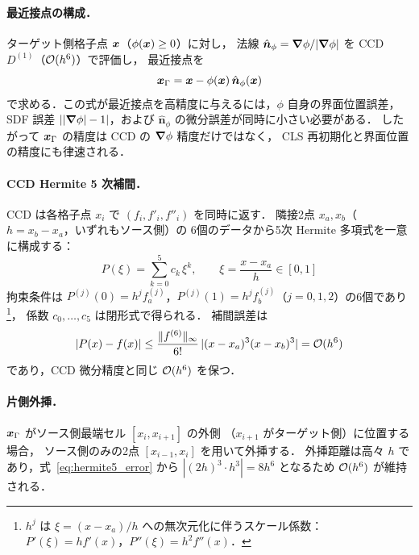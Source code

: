 \paragraph{最近接点の構成．}
ターゲット側格子点 $\bm{x}$（$\phi(\bm{x}) \geq 0$）に対し，
法線 $\hat{\bm n}_{\phi} = \bm{\nabla}\phi/|\bm{\nabla}\phi|$ を CCD $D^{(1)}$（$\mathcal{O}(h^6)$）で評価し，
最近接点を
\begin{equation}
  \bm{x}_\Gamma = \bm{x} - \phi(\bm{x})\,\hat{\bm n}_{\phi}(\bm{x})
  \label{eq:closest_point}
\end{equation}
で求める．この式が最近接点を高精度に与えるには，$\phi$ 自身の界面位置誤差，
SDF 誤差 $||\bm{\nabla}\phi|-1|$，および $\hat{\bm n}_{\phi}$ の微分誤差が同時に小さい必要がある．
したがって $\bm{x}_\Gamma$ の精度は CCD の $\bm{\nabla}\phi$ 精度だけではなく，
CLS 再初期化と界面位置の精度にも律速される．

\paragraph{CCD Hermite 5 次補間．}
CCD は各格子点 $x_i$ で $(f_i, f'_i, f''_i)$ を同時に返す．
隣接2点 $x_a, x_b$（$h = x_b - x_a$，いずれもソース側）の
6個のデータから5次 Hermite 多項式を一意に構成する：
\begin{equation}
  P(\xi) = \sum_{k=0}^{5} c_k \,\xi^k, \qquad \xi = \frac{x - x_a}{h} \in [0,1]
  \label{eq:hermite5}
\end{equation}
拘束条件は $P^{(j)}(0) = h^j f_a^{(j)}$，$P^{(j)}(1) = h^j f_b^{(j)}$（$j = 0,1,2$）の6個であり%
\footnote{$h^j$ は $\xi = (x-x_a)/h$ への無次元化に伴うスケール係数：
$P'(\xi) = h f'(x)$，$P''(\xi) = h^2 f''(x)$．}，
係数 $c_0,\ldots,c_5$ は閉形式で得られる．
補間誤差は
\begin{equation}
  |P(x) - f(x)| \leq \frac{\|f^{(6)}\|_\infty}{6!}\,|(x-x_a)^3(x-x_b)^3| = \mathcal{O}(h^6)
  \label{eq:hermite5_error}
\end{equation}
であり，CCD 微分精度と同じ $\mathcal{O}(h^6)$ を保つ．

\paragraph{片側外挿．}
$\bm{x}_\Gamma$ がソース側最端セル $[x_i, x_{i+1}]$ の外側
（$x_{i+1}$ がターゲット側）に位置する場合，
ソース側のみの2点 $[x_{i-1}, x_i]$ を用いて外挿する．
外挿距離は高々 $h$ であり，式~\eqref{eq:hermite5_error} から
$|(2h)^3 \cdot h^3| = 8h^6$ となるため $\mathcal{O}(h^6)$ が維持される．

